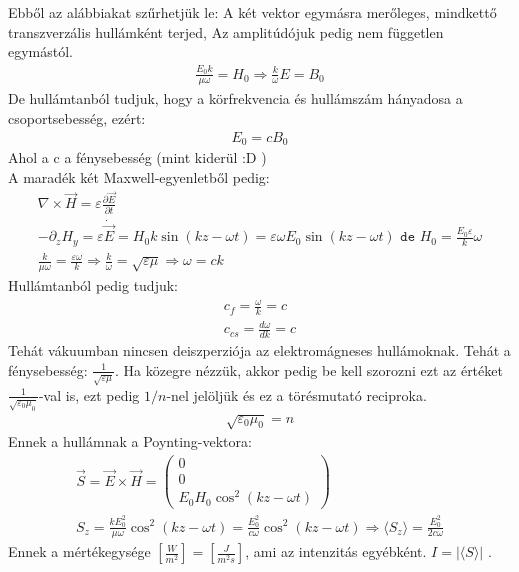 \documentclass{article}
\begin{document}
Ebből az alábbiakat szűrhetjük le: A két vektor egymásra merőleges, mindkettő transzverzális hullámként terjed, Az amplitúdójuk pedig nem független egymástól. 
\begin{gather*}
\frac{E_0 k}{\mu \omega } = H_0 \Rightarrow \frac{k}{\omega} E = B_0
\end{gather*}
De hullámtanból tudjuk, hogy a körfrekvencia és hullámszám hányadosa a csoportsebesség, ezért:
\begin{gather*}
E_0=cB_0
\end{gather*}
Ahol a c a fénysebesség (mint kiderül :D ) \\
A maradék két Maxwell-egyenletből pedig:
\begin{gather*}
\nabla \times \vec{H} = \varepsilon \frac{\partial \vec{E}}{\partial t} \\
-\partial_z H_y = \varepsilon \dot{\vec{E}} = H_0 k \sin(k z - \omega t) = \varepsilon \omega E_0 \sin(kz-\omega t) \texttt{   de   } H_0 = \frac{E_0 \varepsilon}{k}\omega \\
\frac{k}{\mu \omega} = \frac{\varepsilon \omega}{k} \Rightarrow \frac{k}{\omega} = \sqrt{\varepsilon \mu} \Rightarrow \omega = ck
\end{gather*}
Hullámtanból pedig tudjuk:
\begin{gather*}
c_f = \frac{\omega}{k} = c \\
c_{cs} = \frac{d\omega}{dk} = c
\end{gather*}
Tehát vákuumban nincsen deiszperziója az elektromágneses hullámoknak. Tehát a fénysebesség: $\frac{1}{\sqrt{\varepsilon \mu}}$. Ha közegre nézzük, akkor pedig be kell szorozni ezt az értéket $\frac{1}{\sqrt{\varepsilon_0 \mu_0}}$-val is, ezt pedig $1/n$-nel jelöljük és ez a törésmutató reciproka. 
\begin{gather*}
\sqrt{\varepsilon_0 \mu_0} = n
\end{gather*}
Ennek a hullámnak a Poynting-vektora:
\begin{gather*}
\vec{S} = \vec{E} \times \vec{H} = \begin{pmatrix}
0 \\ 0 \\ E_0 H_0 \cos^2(kz-\omega t)
\end{pmatrix} \\
S_z = \frac{kE_0^2}{\mu \omega} \cos^2(kz-\omega t) = \frac{E_0^2}{c\omega} \cos^2(k z - \omega t) \Rightarrow \langle S_z \rangle = \frac{E_0^2}{2c\omega} 
\end{gather*}
Ennek a mértékegysége $[\frac{W}{m^2}] = [\frac{J}{m^2 s}]$, ami az intenzitás egyébként. $I=|\langle S \rangle|$ . \\
\end{document}

